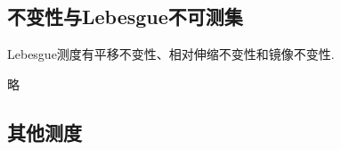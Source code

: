 \subsection{不变性与Lebesgue不可测集}

  \begin{thm}
    Lebesgue测度有平移不变性、相对伸缩不变性和镜像不变性.
  \end{thm}

  \begin{thm}[Lebesgue不可测集]
    略
  \end{thm}

\subsection{其他测度}

  



